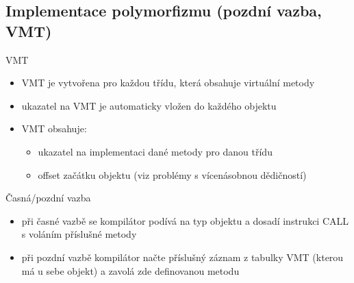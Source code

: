 \subsection{Implementace polymorfizmu (pozdní vazba, VMT)}

\begin{frame}[fragile]
\end{frame}




\begin{frame}[fragile]
\begin{bonusblock}{VMT}
\begin{itemize}
\item VMT je vytvořena pro každou třídu, která obsahuje virtuální metody
\item ukazatel na VMT je automaticky vložen do každého objektu
\item VMT obsahuje:
\begin{itemize}
\item ukazatel na implementaci dané metody pro danou třídu
\item offset začátku objektu (viz problémy s vícenásobnou dědičností)
\end{itemize}
\end{itemize}
\end{bonusblock}

\begin{bonusblock}{Časná/pozdní vazba}
\begin{itemize}
\item při časné vazbě se kompilátor podívá na typ objektu a dosadí instrukci CALL s voláním příslušné metody
\item při pozdní vazbě kompilátor načte příslušný záznam z tabulky VMT (kterou má u sebe objekt) a zavolá zde definovanou metodu
\end{itemize}
\end{bonusblock}
\end{frame}





